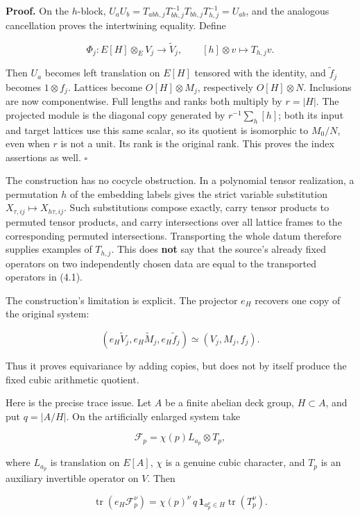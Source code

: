 \documentclass[11pt]{article}
\begin{document}
\textbf{Proof.} On the \(h\)-block, \(U_aU_b=T_{abh,j}T_{bh,j}^{-1}T_{bh,j}T_{h,j}^{-1}=U_{ab}\), and the analogous cancellation proves the intertwining equality. Define

\[
 \Phi_j:E[H]\otimes_E V_j\longrightarrow\widetilde V_j,\qquad
 [h]\otimes v\longmapsto T_{h,j}v.
\]

Then \(U_a\) becomes left translation on \(E[H]\) tensored with the identity, and \(\widetilde f_j\) becomes \(1\otimes f_j\). Lattices become \(O[H]\otimes M_j\), respectively \(O[H]\otimes N\). Inclusions are now componentwise. Full lengths and ranks both multiply by \(r=|H|\). The projected module is the diagonal copy generated by \(r^{-1}\sum_h[h]\); both its input and target lattices use this same scalar, so its quotient is isomorphic to \(M_0/N\), even when \(r\) is not a unit. Its rank is the original rank. This proves the index assertions as well. \(\square\)

The construction has no cocycle obstruction. In a polynomial tensor realization, a permutation \(h\) of the embedding labels gives the strict variable substitution \(X_{\tau,ij}\mapsto X_{h\tau,ij}\). Such substitutions compose exactly, carry tensor products to permuted tensor products, and carry intersections over all lattice frames to the corresponding permuted intersections. Transporting the whole datum therefore supplies examples of \(T_{h,j}\). This does \textbf{not} say that the source's already fixed operators on two independently chosen data are equal to the transported operators in (4.1).

The construction's limitation is explicit. The projector \(e_H\) recovers one copy of the original system:

\[
 (e_H\widetilde V_j,e_H\widetilde M_j,e_H\widetilde f_j)
 \simeq (V_j,M_j,f_j).\tag{4.2}
\]

Thus it proves equivariance by adding copies, but does not by itself produce the fixed cubic arithmetic quotient.

Here is the precise trace issue. Let \(A\) be a finite abelian deck group, \(H\subset A\), and put \(q=|A/H|\). On the artificially enlarged system take

\[
 \mathcal F_p=\chi(p)L_{a_p}\otimes T_p,
\]

where \(L_{a_p}\) is translation on \(E[A]\), \(\chi\) is a genuine cubic character, and \(T_p\) is an auxiliary invertible operator on \(V\). Then

\[
 \operatorname{tr}(e_H\mathcal F_p^\nu)
 =\chi(p)^\nu\,q\,\mathbf{1}_{a_p^\nu\in H}
       \operatorname{tr}(T_p^\nu).\tag{4.3}
\]
\end{document}
